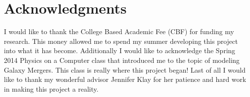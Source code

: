 \documentclass[11pt]{article}
\begin{document}
\section*{Acknowledgments}

I would like to thank the College Based Academic Fee (CBF) for funding my research.  This money allowed me to spend my summer developing this project into what it has become.  Additionally I would like to acknowledge the Spring 2014 Physics on a Computer class that introduced me to the topic of modeling Galaxy Mergers.  This class is really where this project began!  Last of all I would like to thank my wonderful advisor Jennifer Klay for her patience and hard work in making this project a reality.  

\end{document}
